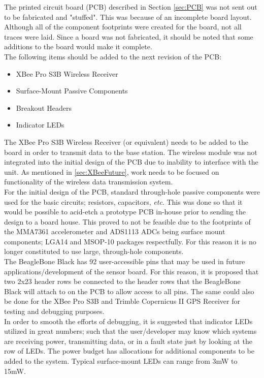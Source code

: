 The printed circuit board (PCB) described in Section \ref{sec:PCB} was not sent out to be fabricated and "stuffed".
This was because of an incomplete board layout.
Although all of the component footprints were created for the board, not all traces were laid.
Since a board was not fabricated, it should be noted that some additions to the board would make it complete.\\
\indent The following items should be added to the next revision of the PCB:
\begin{itemize}
\item XBee Pro S3B Wireless Receiver
\item Surface-Mount Passive Components
\item Breakout Headers
\item Indicator LEDs
\end{itemize}
\indent The XBee Pro S3B Wireless Receiver (or equivalent) needs to be added to the board in order to transmit data to the base station. 
The wireless module was not integrated into the initial design of the PCB due to inability to interface with the unit.
As mentioned in \ref{sec:XBeeFuture}, work needs to be focused on functionality of the wireless data transmission system.\\
\indent For the initial design of the PCB, standard through-hole passive components were used for the basic circuits; resistors, capacitors, \textit{etc}.
This was done so that it would be possible to acid-etch a prototype PCB in-house prior to sending the design to a board house.
This proved to not be feasible due to the footprints of the MMA7361 accelerometer and ADS1113 ADCs being surface mount components; LGA14 and MSOP-10 packages respectfully.
For this reason it is no longer constituted to use large, through-hole components.\\
\indent The BeagleBone Black has 92 user-accessible pins that may be used in future applications/development of the sensor board.
For this reason, it is proposed that two 2x23 header rows be connected to the header rows that the BeagleBone Black will attach to on the PCB to allow access to all pins. 
The same could also be done for the XBee Pro S3B and Trimble Copernicus II GPS Receiver for testing and debugging purposes.\\
\indent In order to smooth the efforts of debugging, it is suggested that indicator LEDs utilized in great numbers; such that the user/developer may know which systems are receiving power, transmitting data, or in a fault state just by looking at the row of LEDs.
The power budget has allocations for additional components to be added to the system.
Typical surface-mount LEDs can range from  3mW to 15mW. 